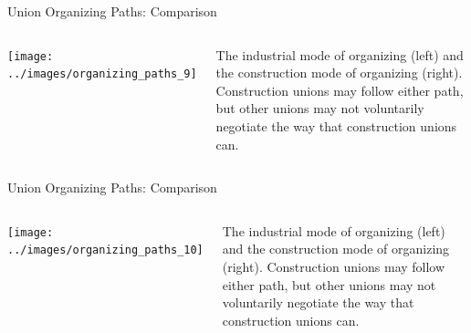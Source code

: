 \documentclass{beamer}
\begin{document}
\begin{frame}{Union Organizing Paths: Comparison}
  \begin{columns}
    \texttt{[image: ../images/organizing\_paths\_9]}

    The industrial mode of organizing (left) and the construction mode of organizing (right).\newline\newline
    Construction unions may follow either path, but other unions may not voluntarily negotiate the way that construction unions can.
    \end{columns}
\end{frame}

\begin{frame}{Union Organizing Paths: Comparison}
  \begin{columns}
    \texttt{[image: ../images/organizing\_paths\_10]}

    The industrial mode of organizing (left) and the construction mode of organizing (right).\newline\newline
    Construction unions may follow either path, but other unions may not voluntarily negotiate the way that construction unions can.
    \end{columns}
\end{frame}
\end{document}
